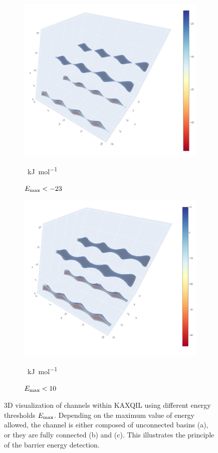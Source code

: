 \documentclass[main]{subfiles}
\begin{document}
\begin{figure}[ht]
\begin{subfigure}[b]{0.3\textwidth}
    \includegraphics[width=\textwidth]{figures/5-diffusion/KAXQIL_23.jpg}
    \caption{$E_{\text{max}}<-23$}~\si{\kJ\per\mole}\label{fgr:KAXQIL_23}
  \end{subfigure}
  \hfill
  \begin{subfigure}[b]{0.3\textwidth}
      \centering
      \includegraphics[width=\textwidth]{figures/5-diffusion/KAXQIL_10.jpg}
      \caption{$E_{\text{max}}<10$}~\si{\kJ\per\mole}\label{fgr:KAXQIL_channel}
  \end{subfigure}
    \caption{ 3D visualization of channels within KAXQIL using different energy thresholds $E_{\text{max}}$. Depending on the maximum value of energy allowed, the channel is either composed of unconnected basins (a), or they are fully connected (b) and (c). This illustrates the principle of the barrier energy detection. }\label{fgr:KAXQIL_channels}
\end{figure}
\end{document}
